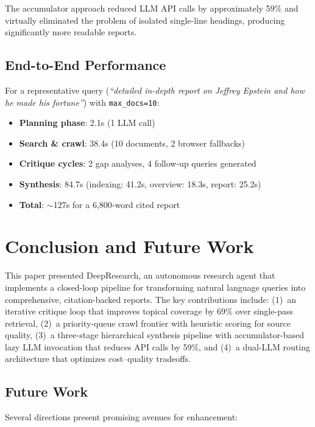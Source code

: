 \documentclass[conference]{IEEEtran}
\begin{document}
The accumulator approach reduced LLM API calls by approximately 59\% and virtually eliminated the problem of isolated single-line headings, producing significantly more readable reports.

\subsection{End-to-End Performance}

For a representative query (\textit{``detailed in-depth report on Jeffrey Epstein and how he made his fortune''}) with \texttt{max\_docs=10}:

\begin{itemize}
    \item \textbf{Planning phase}: 2.1s (1 LLM call)
    \item \textbf{Search \& crawl}: 38.4s (10 documents, 2 browser fallbacks)
    \item \textbf{Critique cycles}: 2 gap analyses, 4 follow-up queries generated
    \item \textbf{Synthesis}: 84.7s (indexing: 41.2s, overview: 18.3s, report: 25.2s)
    \item \textbf{Total}: $\sim$127s for a 6,800-word cited report
\end{itemize}

\section{Conclusion and Future Work}

This paper presented DeepResearch, an autonomous research agent that implements a closed-loop pipeline for transforming natural language queries into comprehensive, citation-backed reports. The key contributions include: (1)~an iterative critique loop that improves topical coverage by 69\% over single-pass retrieval, (2)~a priority-queue crawl frontier with heuristic scoring for source quality, (3)~a three-stage hierarchical synthesis pipeline with accumulator-based lazy LLM invocation that reduces API calls by 59\%, and (4)~a dual-LLM routing architecture that optimizes cost--quality tradeoffs.

\subsection{Future Work}

Several directions present promising avenues for enhancement:
\end{document}
